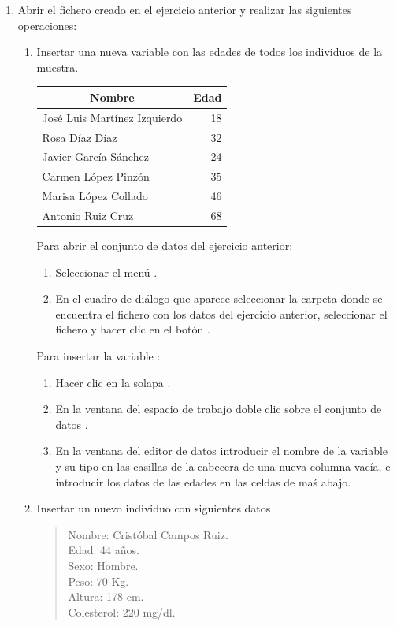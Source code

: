 \begin{enumerate}[leftmargin=*]
\item Abrir el fichero creado en el ejercicio anterior y realizar las siguientes operaciones:

\begin{enumerate}
\item Insertar una nueva variable  con las edades de todos los individuos de la muestra.
\begin{center}
\begin{tabular}{|l|r|}
\hline
\multicolumn{1}{|c|}{Nombre} & \multicolumn{1}{c|}{Edad} \\
\hline
José Luis Martínez Izquierdo & 18 \\
Rosa Díaz Díaz & 32 \\
Javier García Sánchez & 24 \\
Carmen López Pinzón & 35 \\
Marisa López Collado & 46 \\
Antonio Ruiz Cruz & 68 \\
\hline
\end{tabular}
\end{center}

\begin{indicacion}{ Para abrir el conjunto de datos del ejercicio anterior:
\begin{enumerate}
\item Seleccionar el menú .
\item En el cuadro de diálogo que aparece seleccionar la carpeta donde se encuentra el fichero con los datos del ejercicio anterior,
seleccionar el fichero y hacer clic en el botón .
\end{enumerate}
Para insertar la variable :
\begin{enumerate}
\item Hacer clic en la solapa .
\item En la ventana del espacio de trabajo doble clic sobre el conjunto de datos .
\item En la ventana del editor de datos introducir el nombre de la variable  y su tipo en las casillas de la cabecera de una nueva columna vacía, e introducir los datos de las edades en las celdas de maś abajo. 
\end{enumerate}
}
\end{indicacion}

\item Insertar un nuevo individuo con siguientes datos
\begin{quote}
Nombre: Cristóbal Campos Ruiz.\\
Edad: 44 años.\\
Sexo: Hombre.\\
Peso: 70 Kg.\\
Altura: 178 cm.\\
Colesterol: 220 mg/dl.
\end{quote}


\end{enumerate}
\end{enumerate}
